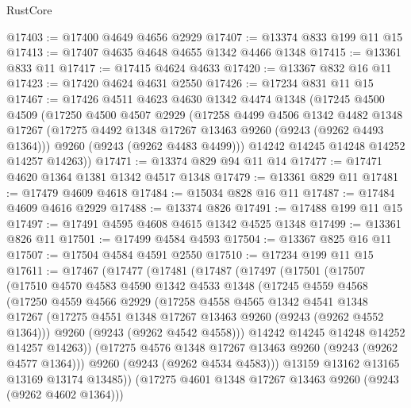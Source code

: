 \begin{lexlean}{RustCore}
\begin{coremodule}
@17403 := @17400 @4649 @4656 @2929
@17407 := @13374 @833 @199 @11 @15
@17413 := @17407 @4635 @4648 @4655 @1342 @4466 @1348
@17415 := @13361 @833 @11
@17417 := @17415 @4624 @4633
@17420 := @13367 @832 @16 @11
@17423 := @17420 @4624 @4631 @2550
@17426 := @17234 @831 @11 @15
@17467 := @17426
    @4511
    @4623
    @4630
    @1342
    @4474
    @1348
    (@17245
      @4500
      @4509
      (@17250
        @4500
        @4507
        @2929
        (@17258
          @4499
          @4506
          @1342
          @4482
          @1348
          @17267
          (@17275 @4492 @1348 @17267 @13463 @9260 (@9243 (@9262 @4493 @1364)))
          @9260
          (@9243 (@9262 @4483 @4499)))
        @14242
        @14245
        @14248
        @14252
        @14257
        @14263))
@17471 := @13374 @829 @94 @11 @14
@17477 := @17471 @4620 @1364 @1381 @1342 @4517 @1348
@17479 := @13361 @829 @11
@17481 := @17479 @4609 @4618
@17484 := @15034 @828 @16 @11
@17487 := @17484 @4609 @4616 @2929
@17488 := @13374 @826
@17491 := @17488 @199 @11 @15
@17497 := @17491 @4595 @4608 @4615 @1342 @4525 @1348
@17499 := @13361 @826 @11
@17501 := @17499 @4584 @4593
@17504 := @13367 @825 @16 @11
@17507 := @17504 @4584 @4591 @2550
@17510 := @17234 @199 @11 @15
@17611 := @17467
    (@17477
      (@17481
        (@17487
          (@17497
            (@17501
              (@17507
                (@17510
                  @4570
                  @4583
                  @4590
                  @1342
                  @4533
                  @1348
                  (@17245
                    @4559
                    @4568
                    (@17250
                      @4559
                      @4566
                      @2929
                      (@17258
                        @4558
                        @4565
                        @1342
                        @4541
                        @1348
                        @17267
                        (@17275 @4551 @1348 @17267 @13463 @9260 (@9243 (@9262 @4552 @1364)))
                        @9260
                        (@9243 (@9262 @4542 @4558)))
                      @14242
                      @14245
                      @14248
                      @14252
                      @14257
                      @14263))
                  (@17275 @4576 @1348 @17267 @13463 @9260 (@9243 (@9262 @4577 @1364)))
                  @9260
                  (@9243 (@9262 @4534 @4583)))
                @13159
                @13162
                @13165
                @13169
                @13174
                @13485))
            (@17275 @4601 @1348 @17267 @13463 @9260 (@9243 (@9262 @4602 @1364)))

\end{coremodule}
\end{lexlean}
